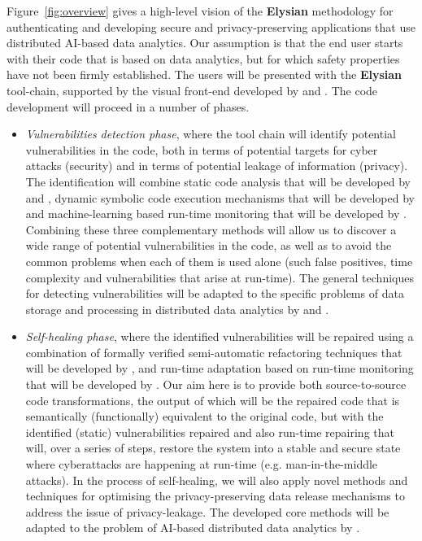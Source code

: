 \documentclass[a4paper,11pt]{article}
\newcommand{\project}[1]{\textbf{#1}\xspace}
\newcommand{\SECURITY}{\project{Elysian}}
\newcommand{\TheProject}{\SECURITY}
\begin{document}
Figure~\ref{fig:overview} gives a high-level vision of the \TheProject{} methodology for authenticating and developing secure and privacy-preserving applications that use distributed AI-based data analytics. Our assumption is that the end user starts with their code that is based on data analytics, but for which safety properties have not been firmly established. The users will be presented with the \TheProject{} tool-chain, supported by the visual front-end developed by \USTANshort{} and \YAGshort{}. The code development will proceed in a number of phases.

\begin{itemize}
\item \emph{Vulnerabilities detection phase}, where the tool chain will identify potential vulnerabilities in the code, both in terms of potential targets for cyber attacks (security) and in terms of potential leakage of information (privacy). The identification will combine static code analysis that will be developed by \YAGshort{} and \UCMshort{}, dynamic symbolic code execution mechanisms that will be developed by \IBMshort{} and machine-learning based run-time monitoring that will be developed by \SCCHshort{}. Combining these three complementary methods will allow us to discover a wide range of potential vulnerabilities in the code, as well as to avoid the common problems when each of them is used alone (such false positives, time complexity and vulnerabilities that arise at run-time). The general techniques for detecting vulnerabilities will be adapted to the specific problems of data storage and processing in distributed data analytics by \UODshort{} and \SCCHshort{}. 

\item \emph{Self-healing phase}, where the identified vulnerabilities will be repaired using a combination of formally verified semi-automatic  refactoring techniques that will be developed by \SAshort{}, and run-time adaptation based on run-time monitoring that will be developed by \SCCHshort{}. Our aim here is to provide both source-to-source code transformations, the output of which will be the repaired code that is semantically (functionally) equivalent to the original code, but with the identified (static) vulnerabilities repaired and also run-time repairing that will, over a series of steps, restore the system into a stable and secure state where cyberattacks are happening at run-time (e.g. man-in-the-middle attacks). In the process of self-healing, we will also apply novel methods and techniques for optimising the privacy-preserving data release mechanisms to address the issue of privacy-leakage. The developed core methods will be adapted to the problem of AI-based distributed data analytics by \UODshort{}. 


\end{itemize}
\end{document}
